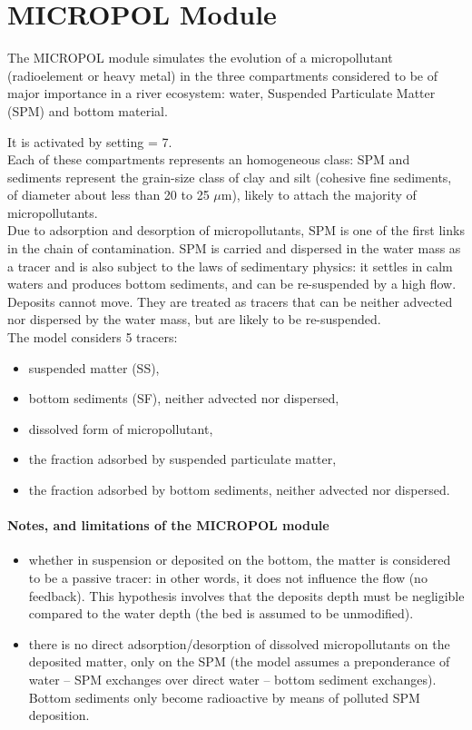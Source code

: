 \chapter{MICROPOL Module}

The MICROPOL module simulates the evolution of a micropollutant (radioelement or heavy metal)
in the three compartments considered to be of major importance in a river ecosystem:
water, Suspended Particulate Matter (SPM) and bottom material.

It is activated by setting  = 7.\\

Each of these compartments represents an homogeneous class:
SPM and sediments represent the grain-size class of clay and silt
(cohesive fine sediments, of diameter about less than 20 to 25 $\mu$m),
likely to attach the majority of micropollutants.\\

Due to adsorption and desorption of micropollutants,
SPM is one of the first links in the chain of contamination.
SPM is carried and dispersed in the water mass
as a tracer and is also subject to the laws of sedimentary physics:
it settles in calm waters and produces bottom sediments,
and can be re-suspended by a high flow.
Deposits cannot move. They are treated as tracers that can be neither advected
nor dispersed by the water mass, but are likely to be re-suspended.\\

The model considers 5 tracers:

\begin{itemize}
\item suspended matter (SS),
\item bottom sediments (SF), neither advected nor dispersed,
\item dissolved form of micropollutant,
\item the fraction adsorbed by suspended particulate matter,
\item the fraction adsorbed by bottom sediments, neither advected nor dispersed.
\end{itemize}

\subsubsection{Notes, and limitations of the MICROPOL module}

\begin{itemize}
\item whether in suspension or deposited on the bottom, the matter is considered
  to be a passive tracer:
  in other words, it does not influence the flow (no feedback).
  This hypothesis involves that the deposits depth must be negligible compared
  to the water depth (the bed is assumed to be unmodified).
\item there is no direct adsorption/desorption of dissolved micropollutants
  on the deposited matter, only on the SPM
  (the model assumes a preponderance of water – SPM exchanges over direct water
  – bottom sediment exchanges).
  Bottom sediments only become radioactive by means of polluted SPM deposition. 
\end{itemize}

